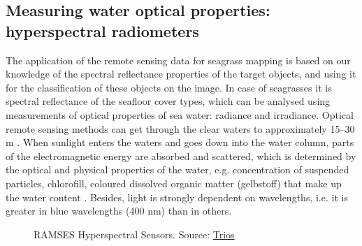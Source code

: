 \documentclass[10pt, a4paper]{article}
\begin{document}
\subsection[Measuring water optical properties]{Measuring water optical properties: \\hyperspectral radiometers}
The application of the remote sensing data for seagrass mapping is based on our knowledge of the
spectral reflectance properties of the target objects, and using it for the classification of these objects
on the image. In case of seagrasses it is spectral reflectance of the seafloor cover types, which can be
analysed using measurements of optical properties of sea water: radiance and irradiance.
Optical remote sensing methods can get through the clear waters to approximately 15–30 m \cite{Mumby04}\label{Mumby04}.
 When sunlight enters the waters and goes down into the water column, parts of the
electromagnetic energy are absorbed and scattered, which is determined by the optical and physical
properties of the water, e.g. concentration of suspended particles, chlorofill, coloured dissolved
organic matter (gelbstoff) that make up the water content \cite{Ackleson2003}\label{Ackleson, 2003}. Besides, light is strongly
dependent on wavelengths, i.e. it is greater in blue wavelengths (400 nm) than in others.

\begin{figure}
	\centering
	\caption{RAMSES Hyperspectral Sensors. Source: \href{http://www.trios.de}{Trios}}
	\label{fig:10}
\end{figure}
\end{document}

